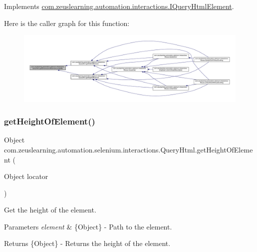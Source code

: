 Implements \hyperlink{interfacecom_1_1zeuslearning_1_1automation_1_1interactions_1_1IQueryHtmlElement_a4a495a5c92eb847a4db5f01ec4d11212}{com.\+zeuslearning.\+automation.\+interactions.\+I\+Query\+Html\+Element}.

Here is the caller graph for this function\+:
\nopagebreak
\begin{figure}[H]
\begin{center}
\leavevmode
\includegraphics[width=350pt]{dc/d41/classcom_1_1zeuslearning_1_1automation_1_1selenium_1_1interactions_1_1QueryHtml_a57c813b972103a0a8160276012d202b2_icgraph}
\end{center}
\end{figure}
\hypertarget{classcom_1_1zeuslearning_1_1automation_1_1selenium_1_1interactions_1_1QueryHtml_a768ebd5b4aac0a5de728e79a59ac9524}{}\label{classcom_1_1zeuslearning_1_1automation_1_1selenium_1_1interactions_1_1QueryHtml_a768ebd5b4aac0a5de728e79a59ac9524} 
\subsubsection{\texorpdfstring{get\+Height\+Of\+Element()}{getHeightOfElement()}}
{\footnotesize\ttfamily Object com.\+zeuslearning.\+automation.\+selenium.\+interactions.\+Query\+Html.\+get\+Height\+Of\+Element (\begin{DoxyParamCaption}\item[{Object}]{locator }\end{DoxyParamCaption})\hspace{0.3cm}{\ttfamily [inline]}}

Get the height of the element.


\begin{DoxyParams}{Parameters}
{\em element} & \{Object\} -\/ Path to the element. \\
\hline
\end{DoxyParams}
\begin{DoxyReturn}{Returns}
\{Object\} -\/ Returns the height of the element. 
\end{DoxyReturn}


